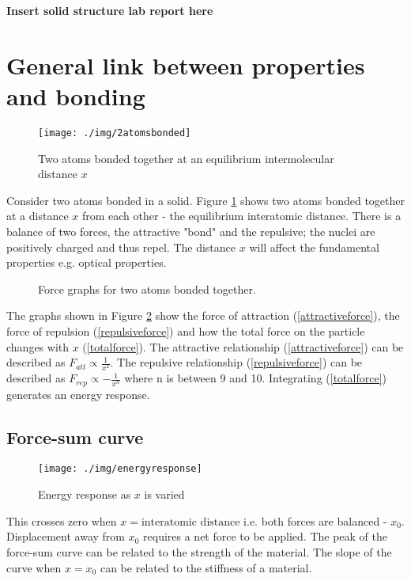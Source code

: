 \textbf{Insert solid structure lab report here}
\section{General link between properties and bonding}
\begin{figure}[h]
  \centering
  \texttt{[image: ./img/2atomsbonded]}\caption{Two atoms bonded together at an equilibrium intermolecular distance $x$}
  \label{2atomsbonded}
\end{figure}
Consider two atoms bonded in a solid. Figure \ref{2atomsbonded} shows two atoms bonded together at a distance $x$ from each other - the equilibrium interatomic distance. There is a balance of two forces, the attractive "bond" and the repulsive; the nuclei are positively charged and thus repel. The distance $x$ will affect the fundamental properties e.g. optical properties.
\begin{figure}[h]
  \centering
  \hfill
  \hfill
  \caption{Force graphs for two atoms bonded together.}
  \label{forcegraphs}
\end{figure}
The graphs shown in Figure \ref{forcegraphs} show the force of attraction (\ref{attractiveforce}), the force of repulsion (\ref{repulsiveforce}) and how the total force on the particle changes with $x$ (\ref{totalforce}). The attractive relationship (\ref{attractiveforce}) can be described as $F_{att} \propto \frac{1}{x^2}$. The repulsive relationship (\ref{repulsiveforce}) can be described as $F_{rep} \propto -\frac{1}{x^n}$ where n is between 9 and 10. Integrating (\ref{totalforce}) generates an energy response.
\subsection{Force-sum curve}
\begin{figure}[h]
  \centering
  \texttt{[image: ./img/energyresponse]}
  \caption{Energy response as $x$ is varied}
  \label{fig:energyresponse}
\end{figure}
This crosses zero when $x = \textrm{interatomic distance}$ i.e. both forces are balanced - $x_0$. Displacement away from $x_0$ requires a net force to be applied. The peak of the force-sum curve can be related to the strength of the material. The slope of the curve when $x=x_0$ can be related to the stiffness of a material.
